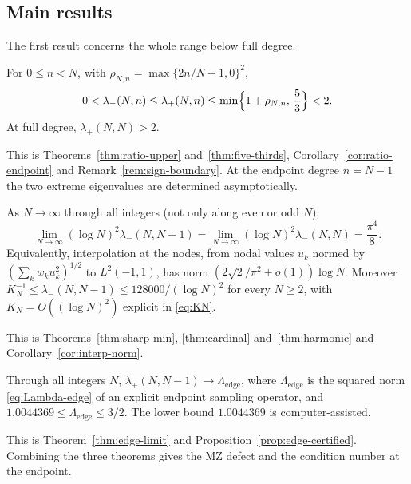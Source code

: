 \documentclass{siamart251216}
\begin{document}
\subsection{Main results}

The first result concerns the whole range below full degree.

\begin{theorem}\label{thm:intro-upper}
For $0\le n<N$, with $\rho_{N,n}=\max\{2n/N-1,0\}^2$,
\begin{equation}\label{eq:main-upper}
 0<\lambda_-(N,n)\le\lambda_+(N,n)\le\min\Bigl\{1+\rho_{N,n},\,\frac53\Bigr\}<2 .
\end{equation}
At full degree, $\lambda_+(N,N)>2$.
\end{theorem}

This is Theorems~\ref{thm:ratio-upper} and~\ref{thm:five-thirds},
Corollary~\ref{cor:ratio-endpoint} and
Remark~\ref{rem:sign-boundary}. At the endpoint degree $n=N-1$ the two
extreme eigenvalues are determined asymptotically.

\begin{theorem}\label{thm:intro-min}
As $N\to\infty$ through all integers (not only along even or odd $N$),
\begin{equation}\label{eq:main-endpoint}
 \lim_{N\to\infty}(\log N)^2\lambda_-(N,N-1)
 =\lim_{N\to\infty}(\log N)^2\lambda_-(N,N)=\frac{\pi^4}8 .
\end{equation}
Equivalently, interpolation at the nodes, from nodal values $u_k$ normed by
$(\sum_kw_ku_k^2)^{1/2}$ to $L^2(-1,1)$, has norm
$(2\sqrt2/\pi^2+o(1))\log N$. Moreover
$K_N^{-1}\le\lambda_-(N,N-1)\le128000/(\log N)^2$ for every $N\ge2$, with
$K_N=O((\log N)^2)$ explicit in \eqref{eq:KN}.
\end{theorem}

This is Theorems~\ref{thm:sharp-min}, \ref{thm:cardinal}
and~\ref{thm:harmonic} and Corollary~\ref{cor:interp-norm}.

\begin{theorem}\label{thm:intro-max}
Through all integers $N$, $\lambda_+(N,N-1)\to\Lambda_{\mathrm{edge}}$, where
$\Lambda_{\mathrm{edge}}$ is the squared norm \eqref{eq:Lambda-edge} of an
explicit endpoint sampling operator, and
$1.0044369\le\Lambda_{\mathrm{edge}}\le3/2$. The lower bound $1.0044369$ is
computer-assisted.
\end{theorem}

This is Theorem~\ref{thm:edge-limit} and
Proposition~\ref{prop:edge-certified}. Combining the three theorems gives the
MZ defect and the condition number at the endpoint.
\end{document}
